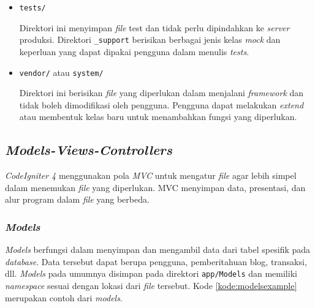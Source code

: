 \begin{itemize}
\item \texttt{tests/}

Direktori ini menyimpan \textit{file} test dan tidak perlu dipindahkan ke \textit{server} produksi. Direktori \verb|_support| berisikan berbagai jenis kelas \textit{mock} dan keperluan yang dapat dipakai pengguna dalam menulis \textit{tests}.

\item \texttt{vendor/} atau \texttt{system/}

Direktori ini berisikan \textit{file} yang diperlukan dalam menjalani \textit{framework} dan tidak boleh dimodifikasi oleh pengguna. Pengguna dapat melakukan \textit{extend} atau membentuk kelas baru untuk menambahkan fungsi yang diperlukan.

\end{itemize}

\subsection{\textit{Models-Views-Controllers}}
\textit{CodeIgniter 4} menggunakan pola \textit{MVC} untuk mengatur \textit{file} agar lebih simpel dalam menemukan \textit{file} yang diperlukan. MVC menyimpan data, presentasi, dan alur program dalam \textit{file} yang berbeda.

\subsubsection{\textit{Models}}

\textit{Models} berfungsi dalam menyimpan dan mengambil data dari tabel spesifik pada \textit{database}. Data tersebut dapat berupa pengguna, pemberitahuan blog, transaksi, dll. \textit{Models} pada umumnya disimpan pada direktori \texttt{app/Models} dan memiliki \textit{namespace} sesuai dengan lokasi dari \textit{file} tersebut. Kode \ref{kode:modelsexample} merupakan contoh dari \textit{models}.

